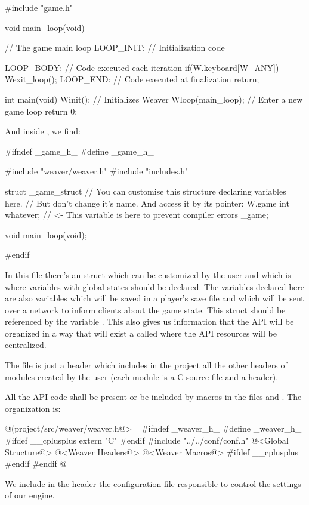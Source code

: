 \alinhaverbatim
#include "game.h"

void main_loop(void){ // The game main loop
 LOOP_INIT: // Initialization code 

 LOOP_BODY: // Code executed each iteration
    if(W.keyboard[W_ANY])
        Wexit_loop();
 LOOP_END: // Code executed at finalization
    return;
}

int main(void){
  Winit(); // Initializes Weaver
  Wloop(main_loop); // Enter a new game loop
  return 0;
}
\alinhanormal

And inside , we find:

\alinhaverbatim
#ifndef _game_h_
#define _game_h_

#include "weaver/weaver.h"
#include "includes.h"

struct _game_struct{
  // You can customise this structure declaring variables here.
  // But don't change it's name. And access it by its pointer: W.game
  int whatever; // <- This variable is here to prevent compiler errors
} _game;

void main_loop(void);

#endif
\alinhanormal

In this file there's an struct which can be customized by the user and
which is where variables with global states should be declared. The
variables declared here are also variables which will be saved in a
player's save file and which will be sent over a network to inform
clients about the game state. This struct should be referenced by the
variable . This also gives us information that the
API will be organized in a way that will exist a 
called  where the API resources will be centralized.

The file  is just a header which includes in
the project all the other headers of modules created by the user (each
module is a C source file and a header).

All the API code shall be present or be included by macros in the
files  and . The
 organization is:

\iniciocodigo
@(project/src/weaver/weaver.h@>=
#ifndef _weaver_h_
#define _weaver_h_
#ifdef __cplusplus
  extern "C" {
#endif
#include "../../conf/conf.h"
@<Global Structure@>
@<Weaver Headers@>
@<Weaver Macros@>
#ifdef __cplusplus
  }
#endif
#endif
@
\fimcodigo

We include in the header the configuration file 
responsible to control the settings of our engine.

